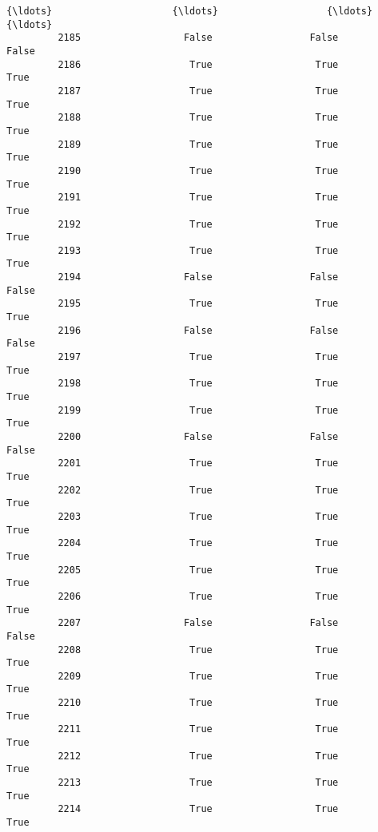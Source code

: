 \documentclass[11pt]{llncs}
\begin{document}
\begin{Verbatim}[commandchars=\\\{\}]
         {\ldots}                     {\ldots}                   {\ldots}                    {\ldots}   
         2185                  False                 False                  False   
         2186                   True                  True                   True   
         2187                   True                  True                   True   
         2188                   True                  True                   True   
         2189                   True                  True                   True   
         2190                   True                  True                   True   
         2191                   True                  True                   True   
         2192                   True                  True                   True   
         2193                   True                  True                   True   
         2194                  False                 False                  False   
         2195                   True                  True                   True   
         2196                  False                 False                  False   
         2197                   True                  True                   True   
         2198                   True                  True                   True   
         2199                   True                  True                   True   
         2200                  False                 False                  False   
         2201                   True                  True                   True   
         2202                   True                  True                   True   
         2203                   True                  True                   True   
         2204                   True                  True                   True   
         2205                   True                  True                   True   
         2206                   True                  True                   True   
         2207                  False                 False                  False   
         2208                   True                  True                   True   
         2209                   True                  True                   True   
         2210                   True                  True                   True   
         2211                   True                  True                   True   
         2212                   True                  True                   True   
         2213                   True                  True                   True   
         2214                   True                  True                   True   
         

\end{Verbatim}
\end{document}
